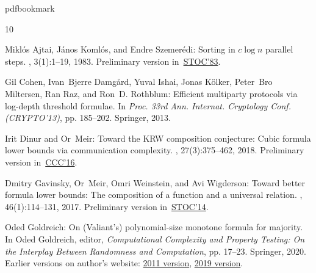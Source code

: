 \newcommand{\prelim}{Preliminary version in\ }\newcommand{\prelims}{Preliminary
  versions in\ }
\providecommand{\bibhead}[1]{}
\expandafter\ifx\csname pdfbookmark\endcsname\relax%
  \providecommand{\tocrefpdfbookmark}{}
\else\providecommand{\tocrefpdfbookmark}{%
   \hypertarget{tocreferences}{}%
   \pdfbookmark[1]{References}{tocreferences}}%
\fi

\tocrefpdfbookmark
\begin{thebibliography}{10}

\bibhead{AKS83}
{\sc Mikl{\'o}s Ajtai, J{\'a}nos Koml{\'o}s, and Endre Szemer{\'e}di}: Sorting
  in $c\log n$ parallel steps.
, 3(1):1--19, 1983.
\newblock \prelim \href{https://doi.org/10.1145/800061.808726}{STOC'83}.
\newblock [\epfmtdoi{10.1007/BF02579338}]

\bibhead{Cohen2013}
{\sc Gil Cohen, Ivan~Bjerre Damg{\aa}rd, Yuval Ishai, Jonas K{\"o}lker,
  Peter~Bro Miltersen, Ran Raz, and Ron~D. Rothblum}: Efficient multiparty
  protocols via log-depth threshold formulae.
\newblock In {\em Proc. 33rd Ann. Internat. Cryptology Conf. (CRYPTO'13)}, pp.
  185--202. Springer, 2013.

\bibhead{DM2018}
{\sc Irit Dinur and Or~Meir}: Toward the {KRW} composition conjecture: Cubic
  formula lower bounds via communication complexity.
, 27(3):375--462, 2018.
\newblock \prelim \href{https://doi.org/10.4230/LIPIcs.CCC.2016.3}{CCC'16}.
\newblock [\epfmtdoi{10.1007/s00037-017-0159-x}]

\bibhead{GMWW2014}
{\sc Dmitry Gavinsky, Or~Meir, Omri Weinstein, and Avi Wigderson}: Toward
  better formula lower bounds: {T}he composition of a function and a universal
  relation.
, 46(1):114--131, 2017.
\newblock \prelim \href{https://doi.org/10.1145/2591796.2591856}{STOC'14}.

\bibhead{Gol2011}
{\sc Oded Goldreich}: On ({V}aliant's) polynomial-size monotone formula for
  majority.
\newblock In {\sc Oded Goldreich}, editor, {\em Computational {C}omplexity and
  {P}roperty {T}esting: {O}n the {I}nterplay {B}etween {R}andomness and
  {C}omputation}, pp. 17--23. Springer, 2020.
\newblock Earlier versions on author's website:
  \href{http://www.wisdom.weizmann.ac.il/~oded/PDF/mono-maj.pdf}{2011 version},
  \href{http://www.wisdom.weizmann.ac.il/~oded/COL2/mono-maj.pdf}{2019
  version}.
\newblock [\epfmtdoi{10.1007/978-3-030-43662-9\_3}]


\end{thebibliography}
